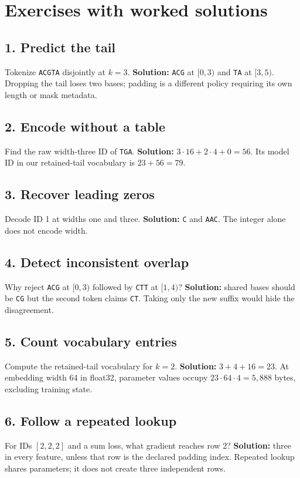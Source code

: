 \section{Exercises with worked solutions}

\subsection*{1. Predict the tail}
Tokenize \texttt{ACGTA} disjointly at $k=3$.
\textbf{Solution:} \texttt{ACG} at $[0,3)$ and \texttt{TA} at $[3,5)$.
Dropping the tail loses two bases; padding is a different policy requiring
its own length or mask metadata.

\subsection*{2. Encode without a table}
Find the raw width-three ID of \texttt{TGA}.
\textbf{Solution:} $3\cdot16+2\cdot4+0=56$. Its model ID in our retained-tail
vocabulary is $23+56=79$.

\subsection*{3. Recover leading zeros}
Decode ID 1 at widths one and three.
\textbf{Solution:} \texttt{C} and \texttt{AAC}. The integer alone does not
encode width.

\subsection*{4. Detect inconsistent overlap}
Why reject \texttt{ACG} at $[0,3)$ followed by \texttt{CTT} at $[1,4)$?
\textbf{Solution:} shared bases should be \texttt{CG} but the second token
claims \texttt{CT}. Taking only the new suffix would hide the disagreement.

\subsection*{5. Count vocabulary entries}
Compute the retained-tail vocabulary for $k=2$.
\textbf{Solution:} $3+4+16=23$. At embedding width 64 in float32, parameter
values occupy $23\cdot64\cdot4=5{,}888$ bytes, excluding training state.

\subsection*{6. Follow a repeated lookup}
For IDs $[2,2,2]$ and a sum loss, what gradient reaches row 2?
\textbf{Solution:} three in every feature, unless that row is the declared
padding index. Repeated lookup shares parameters; it does not create three
independent rows.

